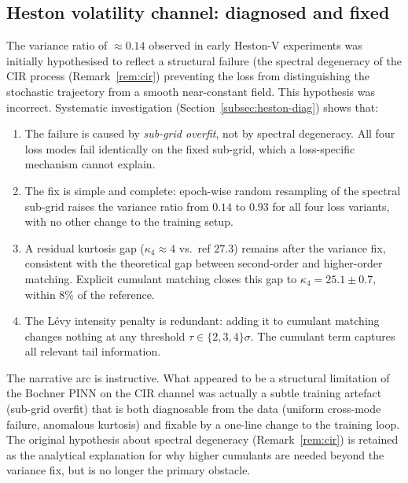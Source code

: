 \documentclass[review,12pt]{elsarticle}
\begin{document}
\subsection{Heston volatility channel: diagnosed and fixed}

The variance ratio of \(\approx 0.14\) observed in early Heston-V
experiments was initially hypothesised to reflect a structural
failure (the spectral degeneracy of the CIR process
(Remark~\ref{rem:cir}) preventing the loss from distinguishing
the stochastic trajectory from a smooth near-constant field. This
hypothesis was incorrect. Systematic investigation
(Section~\ref{subsec:heston-diag}) shows that:

\begin{enumerate}
\item The failure is caused by \emph{sub-grid overfit}, not by
spectral degeneracy. All four loss modes fail identically on the
fixed sub-grid, which a loss-specific mechanism cannot explain.

\item The fix is simple and complete: epoch-wise random resampling
of the spectral sub-grid raises the variance ratio from
\(0.14\) to \(0.93\) for all four loss variants, with no other
change to the training setup.

\item A residual kurtosis gap (\(\kappa_4 \approx 4\) vs.\ ref
\(27.3\)) remains after the variance fix, consistent with the
theoretical gap between second-order and higher-order matching.
Explicit cumulant matching closes this gap to
\(\kappa_4 = 25.1 \pm 0.7\), within 8\% of the reference.

\item The L\'evy intensity penalty is redundant: adding it to
cumulant matching changes nothing at any threshold
\(\tau \in \{2, 3, 4\}\sigma\). The cumulant term captures all
relevant tail information.
\end{enumerate}

The narrative arc is instructive. What appeared to be a structural
limitation of the Bochner PINN on the CIR channel was actually a
subtle training artefact (sub-grid overfit) that is both
diagnosable from the data (uniform cross-mode failure, anomalous
kurtosis) and fixable by a one-line change to the training loop.
The original hypothesis about spectral degeneracy (Remark~\ref{rem:cir})
is retained as the analytical explanation for why higher cumulants
are needed beyond the variance fix, but is no longer the primary
obstacle.
\end{document}
